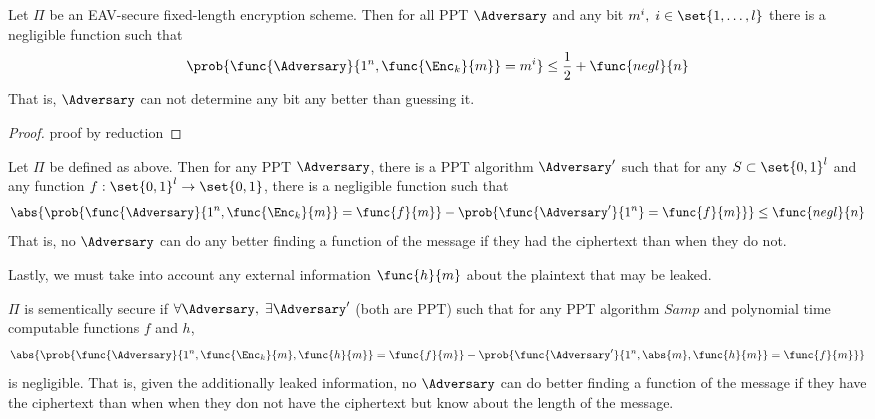 \begin{theorem}
    Let \(\Pi\) be an EAV-secure fixed-length encryption scheme. Then for all PPT \(\Adversary\) and any bit \(m^i,\; i \in \set{1, \dots, l}\) there is a negligible function such that 
    \begin{equation*}
        \prob{\func{\Adversary}{1^n, \func{\Enc_k}{m}} = m^i} \leq \frac{1}{2} + \func{negl}{n}
    \end{equation*}
    That is, \(\Adversary\) can not determine any bit any better than guessing it.
\end{theorem}

\begin{proof}
    proof by reduction
\end{proof}

\begin{theorem}
    Let \(\Pi\) be defined as above. Then for any PPT \(\Adversary\), there is a PPT algorithm \(\Adversary'\) such that for any \(S \subset \set{0,1}^l\) and any function \(f : \set{0,1}^l \to \set{0,1}\), there is a negligible function such that 
    \begin{equation*}
        \abs{\prob{\func{\Adversary}{1^n, \func{\Enc_k}{m}} = \func{f}{m}} - \prob{\func{\Adversary'}{1^n} = \func{f}{m}}} \leq \func{negl}{n}
    \end{equation*}
    That is, no \(\Adversary\) can do any better finding a function of the message if they had the ciphertext than when they do not.
\end{theorem}

Lastly, we must take into account any external information \(\func{h}{m}\) about the plaintext that may be leaked.
\begin{definition}
    \(\Pi\) is sementically secure if \(\forall \Adversary, \; \exists \Adversary'\) (both are PPT) such that for any PPT algorithm \(Samp\) and polynomial time computable functions \(f\) and \(h\), 
    \begin{equation*}
        \abs{\prob{\func{\Adversary}{1^n, \func{\Enc_k}{m} , \func{h}{m}} = \func{f}{m}} - \prob{\func{\Adversary'}{1^n, \abs{m}, \func{h}{m}} = \func{f}{m}}}
    \end{equation*} 
    is negligible. That is, given the additionally leaked information, no \(\Adversary\) can do better finding a function of the message if they have the ciphertext than when when they don not have the ciphertext but know about the length of the message.
\end{definition}

